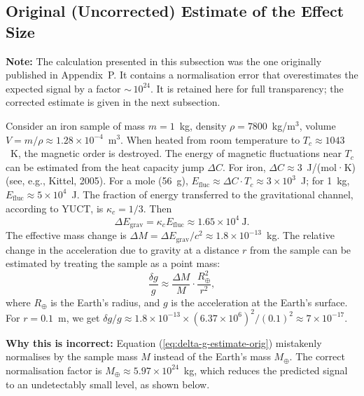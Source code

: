 \documentclass[12pt]{article}
\theoremstyle{remark}
\begin{document}
	\subsection{Original (Uncorrected) Estimate of the Effect Size}
	\label{subsec:lab-estimate-uncorrected}
	
	\textbf{Note:} The calculation presented in this subsection was the one originally
	published in Appendix~P.  It contains a normalisation error that overestimates the
	expected signal by a factor ${\sim}\,10^{24}$.  It is retained here for full
	transparency; the corrected estimate is given in the next subsection.
	
	Consider an iron sample of mass $m = 1$~kg, density $\rho = 7800$~kg/m$^3$, volume
	$V = m/\rho \approx 1.28\times10^{-4}$~m$^3$. When heated from room temperature to
	$T_c \approx 1043$~K, the magnetic order is destroyed. The energy of magnetic
	fluctuations near $T_c$ can be estimated from the heat capacity jump $\Delta C$. For
	iron, $\Delta C \approx 3$~J/(mol·K) (see, e.g., Kittel, 2005). For a mole (56~g),
	$E_{\text{fluc}} \approx \Delta C \cdot T_c \approx 3\times10^3$~J; for 1~kg,
	$E_{\text{fluc}} \approx 5\times10^4$~J. The fraction of energy transferred to the
	gravitational channel, according to YUCT, is $\kappa_c = 1/3$. Then
	\begin{equation}
		\Delta E_{\text{grav}} = \kappa_c E_{\text{fluc}} \approx 1.65\times10^4\ \text{J}.
	\end{equation}
	The effective mass change is $\Delta M = \Delta E_{\text{grav}} / c^2 \approx
	1.8\times10^{-13}$~kg. The relative change in the acceleration due to gravity at a
	distance $r$ from the sample can be estimated by treating the sample as a point mass:
	\begin{equation}
		\frac{\delta g}{g} \approx \frac{\Delta M}{M} \cdot \frac{R_\oplus^2}{r^2},
		\label{eq:delta-g-estimate-orig}
	\end{equation}
	where $R_\oplus$ is the Earth's radius, and $g$ is the acceleration at the Earth's
	surface. For $r = 0.1$~m, we get $\delta g/g \approx 1.8\times10^{-13} \times
	(6.37\times10^6)^2 / (0.1)^2 \approx 7\times10^{-17}$.
	
	\textbf{Why this is incorrect:} Equation (\ref{eq:delta-g-estimate-orig}) mistakenly
	normalises by the sample mass $M$ instead of the Earth's mass $M_\oplus$.  The
	correct normalisation factor is $M_\oplus \approx 5.97\times10^{24}$~kg, which reduces
	the predicted signal to an undetectably small level, as shown below.
	
\end{document}
